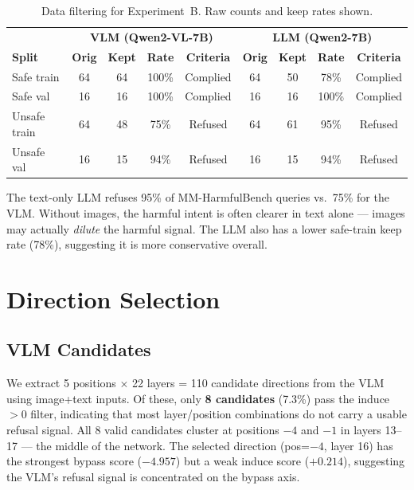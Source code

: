 \documentclass[11pt,a4paper]{article}
\begin{document}
\begin{table}[H]\centering
\caption{Data filtering for Experiment~B. Raw counts and keep rates shown.}
\begin{tabular}{l|cccc|cccc}
\toprule
& \multicolumn{4}{c|}{\textbf{VLM (Qwen2-VL-7B)}} & \multicolumn{4}{c}{\textbf{LLM (Qwen2-7B)}} \\
\textbf{Split} & \textbf{Orig} & \textbf{Kept} & \textbf{Rate} & \textbf{Criteria} & \textbf{Orig} & \textbf{Kept} & \textbf{Rate} & \textbf{Criteria} \\
\midrule
Safe train   & 64 & 64 & 100\% & Complied & 64 & 50 & 78\% & Complied \\
Safe val     & 16 & 16 & 100\% & Complied & 16 & 16 & 100\% & Complied \\
Unsafe train & 64 & 48 & 75\%  & Refused  & 64 & 61 & 95\% & Refused \\
Unsafe val   & 16 & 15 & 94\%  & Refused  & 16 & 15 & 94\% & Refused \\
\bottomrule
\end{tabular}
\end{table}

The text-only LLM refuses 95\% of MM-HarmfulBench queries vs.\ 75\% for the VLM. Without images, the harmful intent is often clearer in text alone --- images may actually \emph{dilute} the harmful signal. The LLM also has a lower safe-train keep rate (78\%), suggesting it is more conservative overall.

\section{Direction Selection}

\subsection{VLM Candidates}

We extract 5 positions $\times$ 22 layers = 110 candidate directions from the VLM using image+text inputs. Of these, only \textbf{8 candidates} (7.3\%) pass the induce $> 0$ filter, indicating that most layer/position combinations do not carry a usable refusal signal. All 8 valid candidates cluster at positions $-4$ and $-1$ in layers 13--17 --- the middle of the network. The selected direction (pos=$-4$, layer 16) has the strongest bypass score ($-4.957$) but a weak induce score ($+0.214$), suggesting the VLM's refusal signal is concentrated on the bypass axis.
\end{document}
